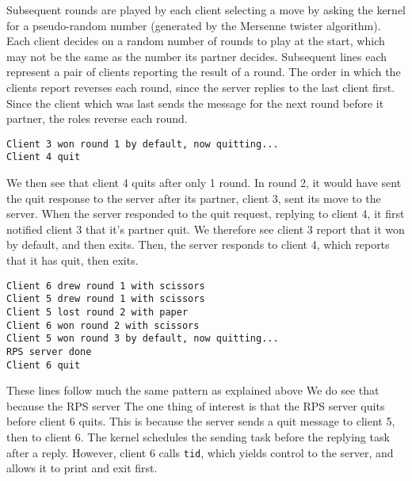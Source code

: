 \documentclass[titlepage]{article}
\begin{document}
Subsequent rounds are played by each client selecting a move by asking the kernel
for a pseudo-random number (generated by the Mersenne twister algorithm).
Each client decides on a random number of rounds to play at the start, which may not
be the same as the number its partner decides.
Subsequent lines each represent a pair of clients reporting the result of a round.
The order in which the clients report reverses each round, since the server replies to
the last client first.
Since the client which was last sends the message for the next round before it partner,
the roles reverse each round.

\begin{verbatim}
Client 3 won round 1 by default, now quitting...
Client 4 quit
\end{verbatim}

We then see that client 4 quits after only 1 round.
In round 2, it would have sent the quit response to the server after its partner, client 3,
sent its move to the server.
When the server responded to the quit request, replying to client 4, it first notified client 3
that it's partner quit.
We therefore see client 3 report that it won by default, and then exits.
Then, the server responds to client 4, which reports that it has quit, then exits.

\begin{verbatim}
Client 6 drew round 1 with scissors
Client 5 drew round 1 with scissors
Client 5 lost round 2 with paper
Client 6 won round 2 with scissors
Client 5 won round 3 by default, now quitting...
RPS server done
Client 6 quit
\end{verbatim}

These lines follow much the same pattern as explained above
We do see that because the RPS server
The one thing of interest is that the RPS server quits before client 6 quits.
This is because the server sends a quit message to client 5, then to client 6.
The kernel schedules the sending task before the replying task after a reply.
However, client 6 calls \texttt{tid}, which yields control to the server,
and allows it to print and exit first.
\end{document}
